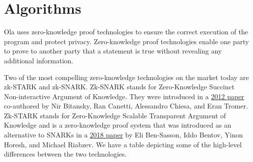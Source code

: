 \section{Algorithms} \label{sec:algorithms}
Ola uses zero-knowledge proof technologies to ensure the correct execution of the program and protect privacy. Zero-knowledge proof technologies enable one party to prove to another party that a statement is true without revealing any additional information. 

Two of the most compelling zero-knowledge technologies on the market today are zk-STARK and zk-SNARK. Zk-SNARK stands for Zero-Knowledge Succinct Non-interactive Argument of Knowledge. They were introduced in a \href{https://dl.acm.org/doi/10.1145/2090236.2090263}{2012 paper} co-authored by Nir Bitansky, Ran Canetti, Alessandro Chiesa, and Eran Tromer. Zk-STARK stands for Zero-Knowledge Scalable Transparent Argument of Knowledge and is a zero-knowledge proof system that was introduced as an alternative to SNARKs in a \href{https://starkware.co/wp-content/uploads/2022/05/STARK-paper.pdf}{2018 paper} by Eli Ben-Sasson, Iddo Bentov, Yinon Horesh, and Michael Riabzev. We have a table depicting some of the high-level differences between the two technologies.

\begin{table}[!ht]
    \centering {}
    \end{table}





